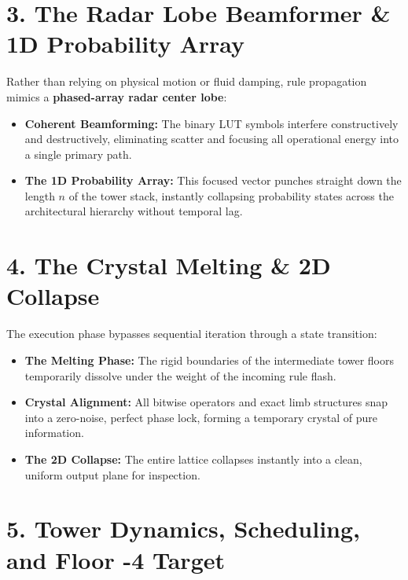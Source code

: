 \medskip

\section{\texorpdfstring{3. The Radar Lobe Beamformer \& 1D Probability Array}{3. The Radar Lobe Beamformer \& 1D Probability Array}}

Rather than relying on physical motion or fluid damping, rule propagation mimics a \textbf{phased-array radar center lobe}:

\begin{itemize}
\item \textbf{Coherent Beamforming:} The binary LUT symbols interfere constructively and destructively, eliminating scatter and focusing all operational energy into a single primary path.
\item \textbf{The 1D Probability Array:} This focused vector punches straight down the length \(n\) of the tower stack, instantly collapsing probability states across the architectural hierarchy without temporal lag.
\end{itemize}

\medskip

\section{\texorpdfstring{4. The Crystal Melting \& 2D Collapse}{4. The Crystal Melting \& 2D Collapse}}

The execution phase bypasses sequential iteration through a state transition:

\begin{itemize}
\item \textbf{The Melting Phase:} The rigid boundaries of the intermediate tower floors temporarily dissolve under the weight of the incoming rule flash.
\item \textbf{Crystal Alignment:} All bitwise operators and exact limb structures snap into a zero-noise, perfect phase lock, forming a temporary crystal of pure information.
\item \textbf{The 2D Collapse:} The entire lattice collapses instantly into a clean, uniform output plane for inspection.
\end{itemize}

\medskip

\section{\texorpdfstring{5. Tower Dynamics, Scheduling, and Floor -4 Target}{5. Tower Dynamics, Scheduling, and Floor -4 Target}}

